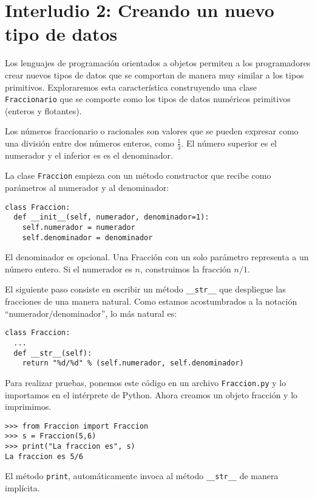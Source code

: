 
\chapter{Interludio 2: Creando un nuevo tipo de datos }

\label{overloading} 

Los lenguajes de programación orientados a objetos permiten a los
programadores crear nuevos tipos de datos que se comportan de manera
muy similar a los tipos primitivos. Exploraremos esta característica
construyendo una clase \texttt{Fraccionario} que se comporte como
los tipos de datos numéricos primitivos (enteros y flotantes).

Los números fraccionario o racionales son valores que se pueden expresar
como una división entre dos números enteros, como $\frac{1}{3}$.
El número superior es el numerador y el inferior es es el denominador.

   

La clase \texttt{Fraccion} empieza con un método constructor que recibe
como parámetros al numerador y al denominador:

\begin{verbatim}
class Fraccion:
  def __init__(self, numerador, denominador=1):
    self.numerador = numerador
    self.denominador = denominador
\end{verbatim}
El denominador es opcional. Una Fracción con un solo parámetro representa
a un número entero. Si el numerador es $n$, construimos la fracción
$n/1$.

El siguiente paso consiste en escribir un método \texttt{\_\_str\_\_}
que despliegue las fracciones de una manera natural. Como estamos
acostumbrados a la notación ``numerador/denominador'', lo más natural
es:

\begin{verbatim}
class Fraccion:
  ...
  def __str__(self):
    return "%d/%d" % (self.numerador, self.denominador)
\end{verbatim}
 Para realizar pruebas, ponemos este código en un archivo \texttt{Fraccion.py}
y lo importamos en el intérprete de Python. Ahora creamos un objeto
fracción y lo imprimimos.

\begin{verbatim}
>>> from Fraccion import Fraccion
>>> s = Fraccion(5,6)
>>> print("La fraccion es", s)
La fraccion es 5/6
\end{verbatim}
 El método \texttt{print}, automáticamente invoca al método \texttt{\_\_str\_\_}
de manera implícita.

